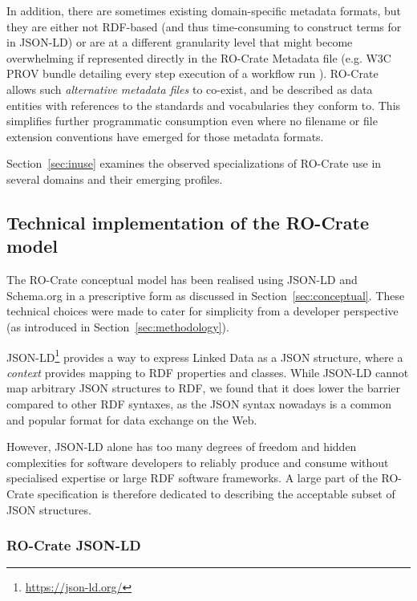 \documentclass[ds,v1.1.2,openaccess]{iosart2x}%
\begin{document}
In addition, there are sometimes existing domain-specific metadata
formats, but they are either not RDF-based (and thus time-consuming to
construct terms for in JSON-LD) or are at a different granularity level
that might become overwhelming if represented directly in the RO-Crate
Metadata file (e.g. W3C PROV bundle detailing every step execution of a
workflow run \cite{doi:10.1093/gigascience/giz095}). RO-Crate allows such
\textit{alternative metadata files} to co-exist, and be described as data
entities with references to the standards and vocabularies they conform
to. This simplifies further programmatic consumption even where no
filename or file extension conventions have emerged for those metadata formats.

Section~\ref{sec:inuse} examines the observed specializations of
RO-Crate use in several domains and their emerging profiles.

\subsection{Technical implementation of the RO-Crate model}%

\label{sec:implementation}

The RO-Crate conceptual model has been realised using JSON-LD and
Schema.org in a prescriptive form as discussed in Section~\ref{sec:conceptual}. These technical choices were made to cater for
simplicity from a developer perspective (as introduced in Section~\ref{sec:methodology}).

JSON-LD\footnote{\url{https://json-ld.org/}} \cite{sporny_2014} provides a way to
express Linked Data as a JSON structure, where a \textit{context} provides
mapping to RDF properties and classes. While JSON-LD cannot map
arbitrary JSON structures to RDF, we found that it does lower the
barrier compared to other RDF syntaxes, as the JSON syntax nowadays is
a common and popular format for data exchange on the Web.

However, JSON-LD alone has too many degrees of freedom and hidden
complexities for software developers to reliably produce and consume
without specialised expertise or large RDF software frameworks. A large
part of the RO-Crate specification is therefore dedicated to describing
the acceptable subset of JSON structures.

\subsubsection{RO-Crate JSON-LD}%
\end{document}
